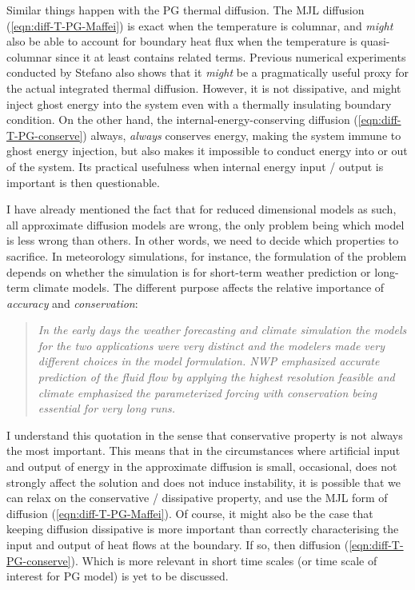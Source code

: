 Similar things happen with the PG thermal diffusion. The MJL diffusion (\ref{eqn:diff-T-PG-Maffei}) is exact when the temperature is columnar, and \textit{might} also be able to account for boundary heat flux when the temperature is quasi-columnar since it at least contains related terms. Previous numerical experiments conducted by Stefano also shows that it \textit{might} be a pragmatically useful proxy for the actual integrated thermal diffusion. However, it is not dissipative, and might inject ghost energy into the system even with a thermally insulating boundary condition. 
On the other hand, the internal-energy-conserving diffusion (\ref{eqn:diff-T-PG-conserve}) always, \textit{always} conserves energy, making the system immune to ghost energy injection, but also makes it impossible to conduct energy into or out of the system. Its practical usefulness when internal energy input / output is important is then questionable.

I have already mentioned the fact that for reduced dimensional models as such, all approximate diffusion models are wrong, the only problem being which model is less wrong than others. In other words, we need to decide which properties to sacrifice. In meteorology simulations, for instance, the formulation of the problem depends on whether the simulation is for short-term weather prediction or long-term climate models. The different purpose affects the relative importance of \textit{accuracy} and \textit{conservation}:
\begin{quotation}
    \textit{In the early days the weather forecasting and climate simulation the models for the two applications were very distinct and the modelers made very different choices in the model formulation. NWP emphasized accurate prediction of the fluid flow by applying the highest resolution feasible and climate emphasized the parameterized forcing with conservation being essential for very long runs.} \parencite{williamson_evolution_2007}
\end{quotation}
I understand this quotation in the sense that conservative property is not always the most important. This means that in the circumstances where artificial input and output of energy in the approximate diffusion is small, occasional, does not strongly affect the solution and does not induce instability, it is possible that we can relax on the conservative / dissipative property, and use the MJL form of diffusion (\ref{eqn:diff-T-PG-Maffei}). Of course, it might also be the case that keeping diffusion dissipative is more important than correctly characterising the input and output of heat flows at the boundary. If so, then diffusion (\ref{eqn:diff-T-PG-conserve}). Which is more relevant in short time scales (or time scale of interest for PG model) is yet to be discussed.




